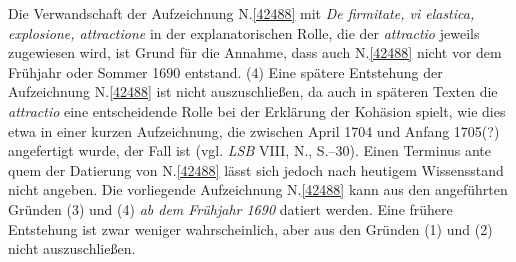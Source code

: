 Die Verwandschaft der Aufzeichnung N.\;\ref{42488} mit \textit{De firmitate, vi elastica, explosione, attractione} in der explanatorischen Rolle, die der \textit{attractio} jeweils zugewiesen wird, ist Grund für die Annahme, dass auch N.\;\ref{42488} nicht vor dem Frühjahr oder Sommer 1690 entstand.
\pend%
\pstart%
(4)
Eine spätere Entstehung der Aufzeichnung N.\;\ref{42488} ist nicht auszuschließen, da auch in späteren Texten die \textit{attractio} eine entscheidende Rolle bei der Erklärung der Kohäsion spielt, wie dies etwa in einer kurzen Aufzeichnung, die zwischen April 1704 und Anfang 1705\;(?) angefertigt wurde, der Fall ist (vgl. \textit{LSB} VIII, N., S.--30).\cite{02617}
Einen Terminus ante quem der Datierung von N.\;\ref{42488} lässt sich jedoch nach heutigem Wissensstand nicht angeben.
\pend%
\pstart%
Die vorliegende Aufzeichnung N.\;\ref{42488} kann aus den angeführten Gründen (3) und (4) \textit{ab dem Frühjahr 1690} datiert werden.
Eine frühere Entstehung ist zwar weniger wahrscheinlich, aber aus den Gründen (1) und (2) nicht auszuschließen.
\pend%
%
\frenchspacing%
\normalsize%
